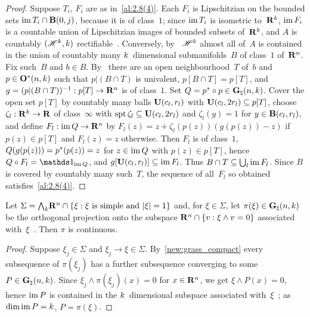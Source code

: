 \begin{proof}
    Suppose $T_i$, $F_i$ are as in~\ref{al:2.8(4)}. Each $F_i$ is Lipschitzian on the bounded
    sets $\operatorname{im} T_i \cap \mathbf{B}(0,j)$, because it is of class~$1$; since $\operatorname{im} T_i$ is isometric
    to~$\mathbf{R}^{k}$, $\operatorname{im} F_i$ is a countable union of Lipschitzian images of bounded subsets
    of~$\mathbf{R}^{k}$, and $A$ is countably $(\mathscr{H}^{k},k)$ rectifiable~\cite[3.2.14]{Federer1969}.
    Conversely, by~\cite[3.2.29]{Federer1969} $\mathscr{H}^{k}$ almost all of~$A$ is contained in the
    union of countably many $k$~dimensional submanifolds~$B$ of class~$1$ of~$\mathbf{R}^{n}$.
    Fix such~$B$ and $b \in B$. By~\cite[3.1.19(5)]{Federer1969} there are an open
    neighbourhood~$T$ of~$b$ and $p \in \mathbf{O}^\ast({n},{k})$ such that $p | (B \cap T)$ is
    univalent, $p[B \cap T] = p[T]$, and $g = (p|(B \cap T))^{-1} : p[T] \to \mathbf{R}^{n}$ is of
    class~$1$. Set $Q = p^{*} \circ p \in \mathbf{G}_{\natural}(n,k)$. Cover the open set
    $p[T]$ by countably many balls $\mathbf{U}(c_l,r_l)$ with $\mathbf{U}(c_l,2r_l) \subseteq p[T]$,
    choose $\zeta_l : \mathbf{R}^{k} \to \mathbf{R}$ of class~$\infty$ with $\operatorname{spt} \zeta_l \subseteq
    \mathbf{U}(c_l,2r_l)$ and $\zeta_l(y) = 1$ for $y \in \mathbf{B}(c_l,r_l)$, and define $F_l : \operatorname{im} Q
    \to \mathbf{R}^{n}$ by $F_l(z) = z + \zeta_l(p(z)) (g(p(z)) - z)$ if $p(z) \in p[T]$ and $F_l(z) =
    z$ otherwise. Then $F_l$ is of class~$1$, $Q(g(p(z))) = p^{*}(p(z)) = z$ for $z \in
    \operatorname{im} Q$ with $p(z) \in p[T]$, hence $Q \circ F_l = \id{\im Q}$, and $g[\mathbf{U}(c_l,r_l)]
    \subseteq \operatorname{im} F_l$. Thus $B \cap T \subseteq {{\textstyle \bigcup}}_l \operatorname{im} F_l$. Since $B$ is covered by
    countably many such~$T$, the sequence of all~$F_l$ so obtained satisfies~\ref{al:2.8(4)}.
\end{proof}

\begin{lemma}[new\MS]
    \label{new:simple_to_projection}
    Let $\Sigma = {\textstyle\boldsymbol{\bigwedge}}_{{k}} \mathbf{R}^{n} \cap \{ \xi : \xi \text{ is simple and } |\xi| = 1
    \}$ and, for $\xi \in \Sigma$, let $\pi(\xi) \in \mathbf{G}_{\natural}(n,k)$ be the orthogonal
    projection onto the subspace $\mathbf{R}^{n} \cap \{ v : \xi \wedge v = 0 \}$ associated
    with~$\xi$~\cite[1.6.1]{Federer1969}. Then $\pi$ is continuous.
\end{lemma}

\begin{proof}
    Suppose $\xi_j \in \Sigma$ and $\xi_j \to \xi \in \Sigma$. By~\ref{new:grass_compact} every
    subsequence of $\pi(\xi_j)$ has a further subsequence converging to some $P \in
    \mathbf{G}_{\natural}(n,k)$. Since $\xi_j \wedge \pi(\xi_j)(x) = 0$ for $x \in \mathbf{R}^{n}$, we get
    $\xi \wedge P(x) = 0$, hence $\operatorname{im} P$ is contained in the $k$~dimensional subspace
    associated with~$\xi$~\cite[1.6.1]{Federer1969}; as $\dim \operatorname{im} P = k$, $P = \pi(\xi)$.
\end{proof}

